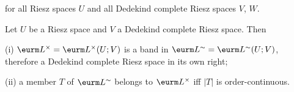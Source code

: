 


\noindent for all Riesz spaces $U$ and all Dedekind complete Riesz
spaces $V$, $W$.

 Let $U$ be a Riesz space and $V$ a Dedekind
complete Riesz space.   Then

(i) $\eurm L^{\times}=\eurm L^{\times}(U;V)$ is a band in
$\eurm L^{\sim}=\eurm L^{\sim}(U;V)$,
therefore a Dedekind complete Riesz space in its own right;

(ii) a member $T$ of $\eurm L^{\sim}$ belongs to $\eurm L^{\times}$ iff
$|T|$ is order-continuous.

